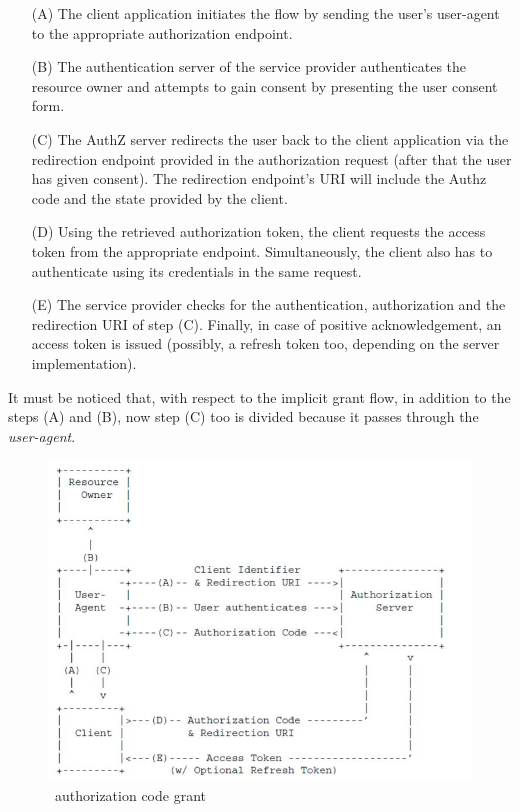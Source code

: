 \begin{itemize}
    \item[(A)]The client application initiates the flow by sending the user's user-agent to the appropriate authorization endpoint.
    \item[(B)]The authentication server of the service provider authenticates the resource owner and attempts to gain consent by presenting the user consent form.
    \item[(C)] The AuthZ server redirects the user back to the client application via the redirection endpoint provided in the authorization request (after that the user has given consent). The redirection endpoint's URI will include the Authz code and the state provided by the client.
    \item[(D)]Using the retrieved authorization token, the client requests the access token from the appropriate endpoint. Simultaneously, the client also has to authenticate using its credentials in the same request.
    \item[(E)] The service provider checks for the authentication, authorization and the redirection URI of step (C). Finally, in case of positive acknowledgement, an access token is issued (possibly, a refresh token too, depending on the server implementation).
\end{itemize}

It must be noticed that, with respect to the implicit grant flow, in addition to the steps (A) and (B), now step (C) too is divided because it passes through the \textit{user-agent}.



\vspace{0.5cm}

\begin{figure}[htbp]
    \centering
    \includegraphics[scale=0.7]{chapters/images/chp2/server.jpg}
    \caption{\ authorization code grant}
    \label{fig:serverflow}
\end{figure}

